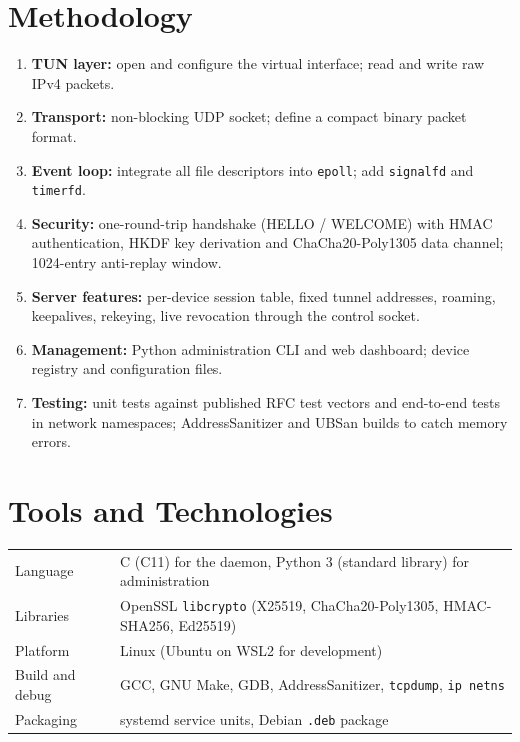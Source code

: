 \documentclass[12pt,a4paper]{article}
\begin{document}
\section{Methodology}
\begin{enumerate}
  \item \textbf{TUN layer:} open and configure the virtual interface; read and write raw IPv4 packets.
  \item \textbf{Transport:} non-blocking UDP socket; define a compact binary packet format.
  \item \textbf{Event loop:} integrate all file descriptors into \texttt{epoll}; add \texttt{signalfd} and \texttt{timerfd}.
  \item \textbf{Security:} one-round-trip handshake (HELLO / WELCOME) with HMAC authentication,
        HKDF key derivation and ChaCha20-Poly1305 data channel; 1024-entry anti-replay window.
  \item \textbf{Server features:} per-device session table, fixed tunnel addresses, roaming,
        keepalives, rekeying, live revocation through the control socket.
  \item \textbf{Management:} Python administration CLI and web dashboard; device registry and configuration files.
  \item \textbf{Testing:} unit tests against published RFC test vectors and end-to-end tests in network namespaces;
        AddressSanitizer and UBSan builds to catch memory errors.
\end{enumerate}

\section{Tools and Technologies}
\begin{tabularx}{\textwidth}{@{}lX@{}}
\toprule
Language & C (C11) for the daemon, Python 3 (standard library) for administration\\
Libraries & OpenSSL \texttt{libcrypto} (X25519, ChaCha20-Poly1305, HMAC-SHA256, Ed25519)\\
Platform & Linux (Ubuntu on WSL2 for development)\\
Build and debug & GCC, GNU Make, GDB, AddressSanitizer, \texttt{tcpdump}, \texttt{ip netns}\\
Packaging & systemd service units, Debian \texttt{.deb} package\\
\bottomrule
\end{tabularx}
\end{document}
